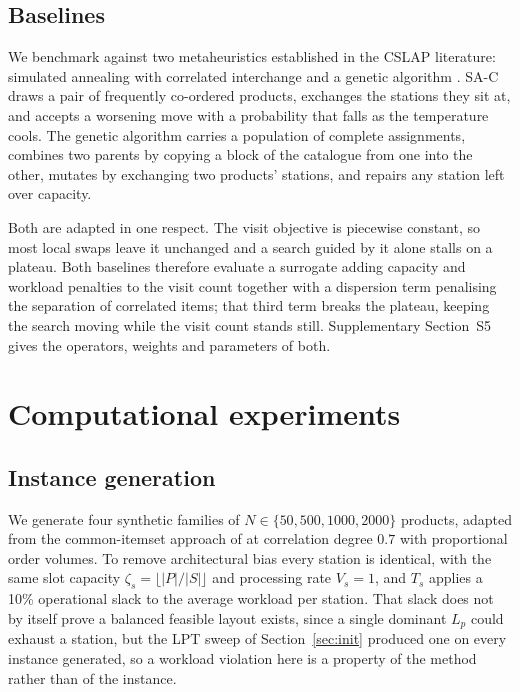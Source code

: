 \documentclass[]{interact}
\begin{document}
\subsection{Baselines}\label{sec:baselines}
We benchmark against two metaheuristics established in the CSLAP literature: simulated annealing with correlated interchange \citep{kim2012, zhang2019cie} and a genetic algorithm \citep{pan2015}. SA-C draws a pair of frequently co-ordered products, exchanges the stations they sit at, and accepts a worsening move with a probability that falls as the temperature cools. The genetic algorithm carries a population of complete assignments, combines two parents by copying a block of the catalogue from one into the other, mutates by exchanging two products' stations, and repairs any station left over capacity.

Both are adapted in one respect. The visit objective is piecewise constant, so most local swaps leave it unchanged and a search guided by it alone stalls on a plateau. Both baselines therefore evaluate a surrogate adding capacity and workload penalties to the visit count together with a dispersion term penalising the separation of correlated items; that third term breaks the plateau, keeping the search moving while the visit count stands still. Supplementary Section~S5 gives the operators, weights and parameters of both.

\section{Computational experiments}\label{sec:experiments}
\subsection{Instance generation}
We generate four synthetic families of $N \in \{50, 500, 1000, 2000\}$ products, adapted from the common-itemset approach of \citet{zhang2019cie} at correlation degree $0.7$ with proportional order volumes. To remove architectural bias every station is identical, with the same slot capacity $\zeta_s = \lfloor |P|/|S| \rfloor$ and processing rate $V_s = 1$, and $T_s$ applies a 10\% operational slack to the average workload per station. That slack does not by itself prove a balanced feasible layout exists, since a single dominant $L_p$ could exhaust a station, but the LPT sweep of Section~\ref{sec:init} produced one on every instance generated, so a workload violation here is a property of the method rather than of the instance.
\end{document}
